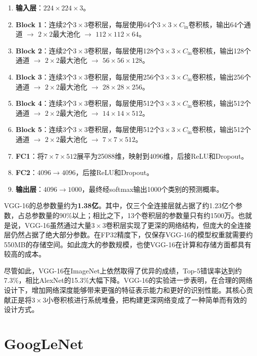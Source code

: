 \begin{enumerate}
    \item \textbf{输入层}：$224\times224\times3$。
    \item \textbf{Block 1}：连续2个$3\times3$卷积层，每层使用64个$3\times3\times C_{\mathrm{in}}$卷积核，输出64个通道 $\to$ $2\times2$最大池化 $\to$ $112\times112\times64$。
    \item \textbf{Block 2}：连续2个$3\times3$卷积层，每层使用128个$3\times3\times C_{\mathrm{in}}$卷积核，输出128个通道 $\to$ $2\times2$最大池化 $\to$ $56\times56\times128$。
    \item \textbf{Block 3}：连续3个$3\times3$卷积层，每层使用256个$3\times3\times C_{\mathrm{in}}$卷积核，输出256个通道 $\to$ $2\times2$最大池化 $\to$ $28\times28\times256$。
    \item \textbf{Block 4}：连续3个$3\times3$卷积层，每层使用512个$3\times3\times C_{\mathrm{in}}$卷积核，输出512个通道 $\to$ $2\times2$最大池化 $\to$ $14\times14\times512$。
    \item \textbf{Block 5}：连续3个$3\times3$卷积层，每层使用512个$3\times3\times C_{\mathrm{in}}$卷积核，输出512个通道 $\to$ $2\times2$最大池化 $\to$ $7\times7\times512$。
    \item \textbf{FC1}：将$7\times7\times512$展平为25088维，映射到4096维，后接ReLU和Dropout。
    \item \textbf{FC2}：$4096\to4096$，后接ReLU和Dropout。
    \item \textbf{输出层}：$4096\to1000$，最终经softmax输出1000个类别的预测概率。
\end{enumerate}

VGG-16的总参数量约为\textbf{1.38亿}。其中，仅三个全连接层就占据了约1.23亿个参数，占总参数量的90\%以上；相比之下，13个卷积层的参数量只有约1500万。也就是说，VGG-16虽然通过大量$3\times3$卷积层实现了更深的网络结构，但庞大的全连接层仍然占据了绝大部分参数。在FP32精度下，仅保存VGG-16的模型权重就需要约550MB的存储空间。如此庞大的参数规模，也使VGG-16在计算和存储方面都具有较高的成本。

尽管如此，VGG-16在ImageNet上依然取得了优异的成绩，Top-5错误率达到约7.3\%，相比AlexNet的15.3\%大幅下降。VGG-16的实验进一步表明，在合理的网络设计下，增加网络深度能够带来更强的特征表示能力和更好的识别性能。其核心贡献正是将$3\times3$小卷积核进行系统堆叠，把构建更深网络变成了一种简单而有效的设计方式。

\section{GoogLeNet}

